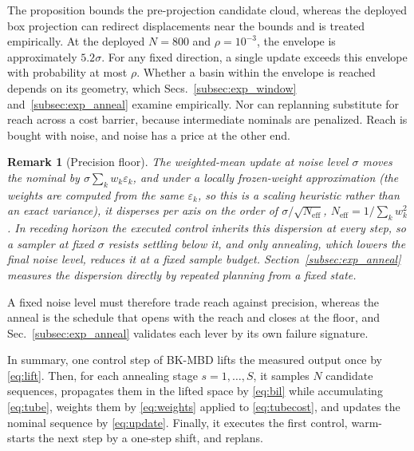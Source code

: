 \documentclass[letterpaper,10pt,conference]{ieeeconf}
\newtheorem{remark}{Remark}
\newcommand{\bkmbd}{\textsc{BK-MBD}}
\begin{document}
The proposition bounds the pre-projection candidate cloud, whereas the deployed box projection can redirect displacements near the bounds and is treated empirically.
At the deployed $N = 800$ and $\rho = 10^{-3}$, the envelope is approximately $5.2\sigma$. For any fixed direction, a single update exceeds this envelope with probability at most $\rho$. Whether a basin within the envelope is reached depends on its geometry, which Secs.~\ref{subsec:exp_window} and~\ref{subsec:exp_anneal} examine empirically.
Nor can replanning substitute for reach across a cost barrier, because intermediate nominals are penalized.
Reach is bought with noise, and noise has a price at the other end.

\begin{remark}[Precision floor]\label{rem:floor}
The weighted-mean update at noise level $\sigma$ moves the nominal by $\sigma \sum_k w_k \varepsilon_k$, and under a locally frozen-weight approximation (the weights are computed from the same $\varepsilon_k$, so this is a scaling heuristic rather than an exact variance), it disperses per axis on the order of $\sigma / \sqrt{N_{\mathrm{eff}}}$, $N_{\mathrm{eff}} = 1 / \sum_k w_k^{2}$.
In receding horizon the executed control inherits this dispersion at every step, so a sampler at fixed $\sigma$ resists settling below it, and only annealing, which lowers the final noise level, reduces it at a fixed sample budget.
Section~\ref{subsec:exp_anneal} measures the dispersion directly by repeated planning from a fixed state.
\end{remark}

A fixed noise level must therefore trade reach against precision, whereas the anneal is the schedule that opens with the reach and closes at the floor, and Sec.~\ref{subsec:exp_anneal} validates each lever by its own failure signature.

In summary, one control step of \bkmbd{} lifts the measured output once by \eqref{eq:lift}. Then, for each annealing stage $s = 1, \dots, S$, it samples $N$ candidate sequences, propagates them in the lifted space by \eqref{eq:bil} while accumulating \eqref{eq:tube}, weights them by \eqref{eq:weights} applied to \eqref{eq:tubecost}, and updates the nominal sequence by \eqref{eq:update}. Finally, it executes the first control, warm-starts the next step by a one-step shift, and replans.

\end{document}
